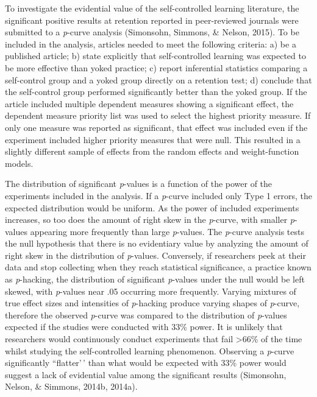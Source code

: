 \documentclass[
  english,
  man,floatsintext]{apa7}
\begin{document}
To investigate the evidential value of the self-controlled learning literature, the significant positive results at retention reported in peer-reviewed journals were submitted to a \emph{p}-curve analysis (Simonsohn, Simmons, \& Nelson, 2015). To be included in the analysis, articles needed to meet the following criteria: a) be a published article; b) state explicitly that self-controlled learning was expected to be more effective than yoked practice; c) report inferential statistics comparing a self-control group and a yoked group directly on a retention test; d) conclude that the self-control group performed significantly better than the yoked group. If the article included multiple dependent measures showing a significant effect, the dependent measure priority list was used to select the highest priority measure. If only one measure was reported as significant, that effect was included even if the experiment included higher priority measures that were null. This resulted in a slightly different sample of effects from the random effects and weight-function models.

The distribution of significant \emph{p}-values is a function of the power of the experiments included in the analysis. If a \emph{p}-curve included only Type 1 errors, the expected distribution would be uniform. As the power of included experiments increases, so too does the amount of right skew in the \emph{p}-curve, with smaller \emph{p}-values appearing more frequently than large \emph{p}-values. The \emph{p}-curve analysis tests the null hypothesis that there is no evidentiary value by analyzing the amount of right skew in the distribution of \emph{p}-values. Conversely, if researchers peek at their data and stop collecting when they reach statistical significance, a practice known as \emph{p}-hacking, the distribution of significant \emph{p}-values under the null would be left skewed, with \emph{p}-values near .05 occurring more frequently. Varying mixtures of true effect sizes and intensities of \emph{p}-hacking produce varying shapes of \emph{p}-curve, therefore the observed \emph{p}-curve was compared to the distribution of \emph{p}-values expected if the studies were conducted with 33\% power. It is unlikely that researchers would continuously conduct experiments that fail \textgreater66\% of the time whilst studying the self-controlled learning phenomenon. Observing a \emph{p}-curve significantly ``flatter'\,' than what would be expected with 33\% power would suggest a lack of evidential value among the significant results (Simonsohn, Nelson, \& Simmons, 2014b, 2014a).
\end{document}
